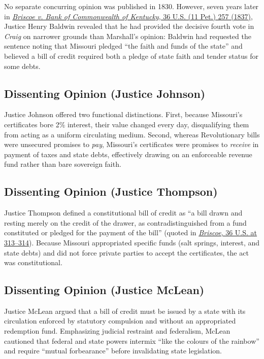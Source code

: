 \documentclass[12pt]{article}
\begin{document}
No separate concurring opinion was published in 1830. However, seven years later in \href{https://supreme.justia.com/cases/federal/us/36/257/}{\textit{Briscoe v. Bank of Commonwealth of Kentucky}, 36 U.S. (11 Pet.) 257 (1837)}, Justice Henry Baldwin revealed that he had provided the decisive fourth vote in \textit{Craig} on narrower grounds than Marshall's opinion: Baldwin had requested the sentence noting that Missouri pledged ``the faith and funds of the state'' and believed a bill of credit required both a pledge of state faith and tender status for some debts.

\subsection{Dissenting Opinion (Justice Johnson)}

Justice Johnson offered two functional distinctions. First, because Missouri's certificates bore 2\% interest, their value changed every day, disqualifying them from acting as a uniform circulating medium. Second, whereas Revolutionary bills were unsecured promises to \textit{pay}, Missouri's certificates were promises to \textit{receive} in payment of taxes and state debts, effectively drawing on an enforceable revenue fund rather than bare sovereign faith.

\subsection{Dissenting Opinion (Justice Thompson)}

Justice Thompson defined a constitutional bill of credit as ``a bill drawn and resting merely on the credit of the drawer, as contradistinguished from a fund constituted or pledged for the payment of the bill'' (quoted in \href{https://supreme.justia.com/cases/federal/us/36/257/}{\textit{Briscoe}, 36 U.S. at 313--314}). Because Missouri appropriated specific funds (salt springs, interest, and state debts) and did not force private parties to accept the certificates, the act was constitutional.

\subsection{Dissenting Opinion (Justice McLean)}

Justice McLean argued that a bill of credit must be issued by a state with its circulation enforced by statutory compulsion and without an appropriated redemption fund. Emphasizing judicial restraint and federalism, McLean cautioned that federal and state powers intermix ``like the colours of the rainbow'' and require ``mutual forbearance'' before invalidating state legislation.
\end{document}
